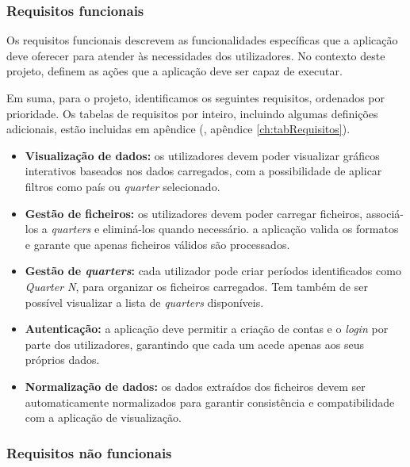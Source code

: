 \subsubsection{Requisitos funcionais}

Os requisitos funcionais descrevem as funcionalidades específicas que a aplicação deve oferecer para atender às necessidades dos utilizadores. No contexto deste projeto, definem as ações que a aplicação deve ser capaz de executar.

Em suma, para o projeto, identificamos os seguintes requisitos, ordenados por prioridade. Os tabelas de requisitos por inteiro, incluindo algumas definições adicionais, estão incluidas em apêndice (\cf, apêndice \ref{ch:tabRequisitos}).

\begin{itemize}
    \item \textbf{Visualização de dados:} os utilizadores devem poder visualizar gráficos interativos baseados nos dados carregados, com a possibilidade de aplicar filtros como país ou \textit{quarter} selecionado.

    \item \textbf{Gestão de ficheiros:} os utilizadores devem poder carregar ficheiros, associá-los a \textit{quarters} e eliminá-los quando necessário. a aplicação valida os formatos e garante que apenas ficheiros válidos são processados.
    
    \item \textbf{Gestão de \textit{quarters}:} cada utilizador pode criar períodos identificados como \textit{Quarter N}, para organizar os ficheiros carregados. Tem também de ser possível visualizar a lista de \textit{quarters} disponíveis.

    \item \textbf{Autenticação:} a aplicação deve permitir a criação de contas e o \textit{login} por parte dos utilizadores, garantindo que cada um acede apenas aos seus próprios dados.

    \item \textbf{Normalização de dados:} os dados extraídos dos ficheiros devem ser automaticamente normalizados para garantir consistência e compatibilidade com a aplicação de visualização.
    
\end{itemize}

\subsubsection{Requisitos não funcionais}

